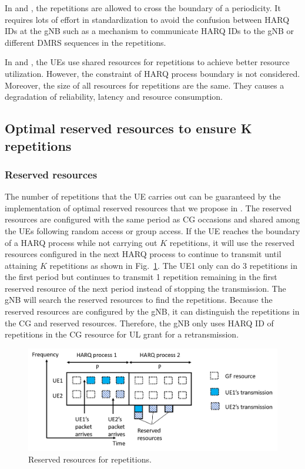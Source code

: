 \documentclass{ieeeaccess}
\begin{document}
In \cite{ref8} and \cite{ref9}, the repetitions are allowed to cross the boundary of a periodicity. It requires lots of effort in standardization to avoid the confusion between HARQ IDs at the gNB such as a mechanism to communicate HARQ IDs to the gNB or different DMRS sequences in the repetitions.

In \cite{ref10} and \cite{ref11}, the UEs use shared resources for repetitions to achieve better resource utilization. However, the constraint of HARQ process boundary is not considered. Moreover, the size of all resources for repetitions are the same. They causes a degradation of reliability, latency and resource consumption.

\subsection{Optimal reserved resources to ensure K repetitions}\label{IIIB}

\subsubsection {Reserved resources}

The number of repetitions that the UE carries out can be guaranteed by the implementation of optimal reserved resources that we propose in \cite{b9}. The reserved resources are configured with the same period as CG occasions and shared among the UEs following random access or group access. If the UE reaches the boundary of a HARQ process while not carrying out $K$ repetitions, it will use the reserved resources configured in the next HARQ process to continue to transmit until attaining $K$ repetitions as shown in Fig.~\ref{fig5}. The UE1 only can do 3 repetitions in the first period but continues to transmit 1 repetition remaining in the first reserved resource of the next period instead of stopping the transmission. The gNB will search the reserved resources to find the repetitions. Because the reserved resources are configured by the gNB, it can distinguish the repetitions in the CG and reserved resources. Therefore, the gNB only uses HARQ ID of repetitions in the CG resource for UL grant for a retransmission.

\begin{figure}[htbp]
\centerline{\includegraphics[scale=0.32]{fig5.png}}
\caption{Reserved resources for repetitions.}
\label{fig5}
\vspace{-2mm}
\end{figure}
\end{document}
